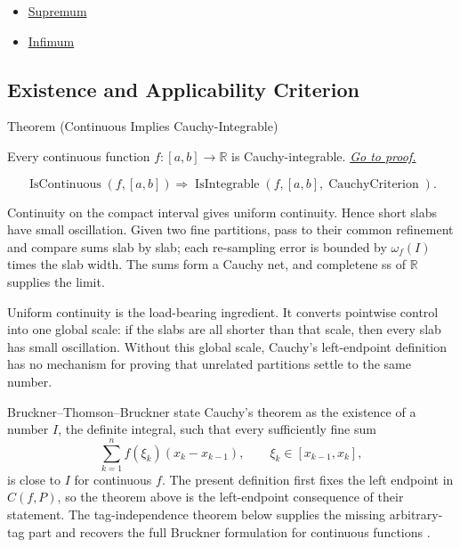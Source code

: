 \begin{dependencies}
\begin{itemize}
  \item \hyperref[def:supremum]{Supremum}
  \item \hyperref[def:infimum]{Infimum}
\end{itemize}
\end{dependencies}

\subsection*{Existence and Applicability Criterion}

\begin{theorembox}{Theorem (Continuous Implies Cauchy-Integrable)}
\begin{theorem}
\label{thm:continuous-cauchy-integrable}
Every continuous function \(f:[a,b]\to\mathbb R\) is Cauchy-integrable.
\hyperref[prf:continuous-cauchy-integrable]{\textit{Go to proof.}}
\end{theorem}
\end{theorembox}

\begin{remark*}
\[
\operatorname{IsContinuous}(f,[a,b])
\Longrightarrow
\operatorname{IsIntegrable}(f,[a,b],\operatorname{CauchyCriterion}).
\]
\end{remark*}

\begin{remark*}[Interpretation]
Continuity on the compact interval gives uniform continuity. Hence short slabs
have small oscillation. Given two fine partitions, pass to their common
refinement and compare sums slab by slab; each re-sampling error is bounded by
\(\omega_f(I)\) times the slab width. The sums form a Cauchy net, and
completene
ss of \(\mathbb R\) supplies the limit.


Uniform continuity is the load-bearing ingredient. It converts pointwise
control into one global scale: if the slabs are all shorter than that scale,
then every slab has small oscillation. Without this global scale, Cauchy's
left-endpoint definition has no mechanism for proving that unrelated
partitions settle to the same number.
\end{remark*}

\begin{remark*}
Bruckner--Thomson--Bruckner state Cauchy's theorem as the existence of a
number \(I\), the definite integral, such that every sufficiently fine sum
\[
  \sum_{k=1}^{n} f(\xi_k)(x_k-x_{k-1}),
  \qquad \xi_k\in[x_{k-1},x_k],
\]
is close to \(I\) for continuous \(f\). The present definition first fixes the
left endpoint in \(C(f,P)\), so the theorem above is the left-endpoint
consequence of their statement. The tag-independence theorem below supplies
the missing arbitrary-tag part and recovers the full Bruckner formulation for
continuous functions \cite{ThomsonBrucknerBrucknerElementaryRealAnalysis2Integration}.
\end{remark*}

